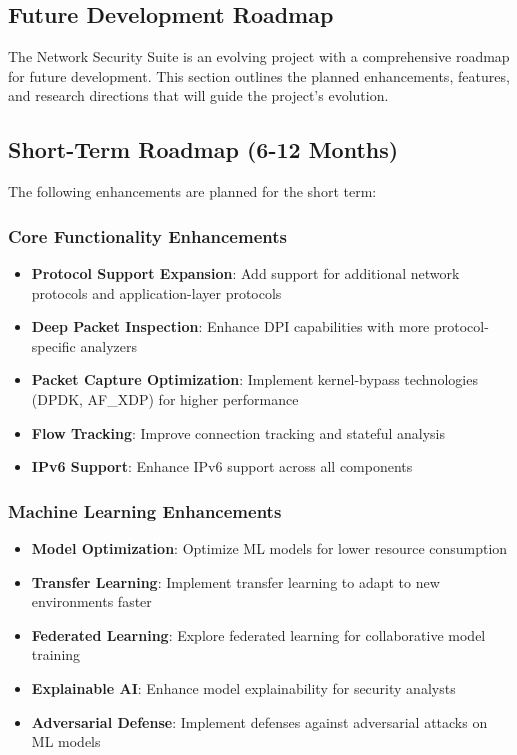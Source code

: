 \subsection{Future Development Roadmap}
The Network Security Suite is an evolving project with a comprehensive roadmap for future development. This section outlines the planned enhancements, features, and research directions that will guide the project's evolution.

\subsection{Short-Term Roadmap (6-12 Months)}
The following enhancements are planned for the short term:

\subsubsection{Core Functionality Enhancements}
\begin{itemize}
    \item \textbf{Protocol Support Expansion}: Add support for additional network protocols and application-layer protocols
    \item \textbf{Deep Packet Inspection}: Enhance DPI capabilities with more protocol-specific analyzers
    \item \textbf{Packet Capture Optimization}: Implement kernel-bypass technologies (DPDK, AF\_XDP) for higher performance
    \item \textbf{Flow Tracking}: Improve connection tracking and stateful analysis
    \item \textbf{IPv6 Support}: Enhance IPv6 support across all components
\end{itemize}

\subsubsection{Machine Learning Enhancements}
\begin{itemize}
    \item \textbf{Model Optimization}: Optimize ML models for lower resource consumption
    \item \textbf{Transfer Learning}: Implement transfer learning to adapt to new environments faster
    \item \textbf{Federated Learning}: Explore federated learning for collaborative model training
    \item \textbf{Explainable AI}: Enhance model explainability for security analysts
    \item \textbf{Adversarial Defense}: Implement defenses against adversarial attacks on ML models
\end{itemize}

